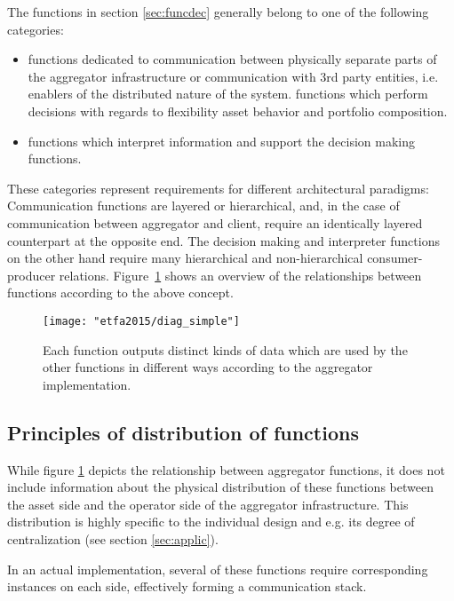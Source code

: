The functions in section \ref{sec:funcdec} generally belong to one of the following categories:
\begin{itemize}
\item functions dedicated to communication between physically separate parts of the aggregator infrastructure or communication with 3rd party entities, i.e. enablers of the distributed nature of the system.
\m functions which perform decisions with regards to flexibility asset behavior and portfolio composition.
\item functions which interpret information and support the decision making functions. 
\end{itemize}
These categories represent requirements for different architectural paradigms: Communication functions are layered or hierarchical, and, in the case of communication between aggregator and client, require an identically layered counterpart at the opposite end. The decision making and interpreter functions on the other hand require many hierarchical and non-hierarchical consumer-producer relations. %
Figure~\ref{fig:functiondiagram} shows an overview of the relationships between functions according to the above concept.

\begin{figure}[htb]
\centering
\texttt{[image: "etfa2015/diag\_simple"]}
\caption{Each function outputs distinct kinds of data which are used by the other functions in different ways according to the aggregator implementation.}
\label{fig:functiondiagram}
\end{figure}

\subsection{Principles of distribution of functions}

While figure \ref{fig:functiondiagram} depicts the relationship between aggregator functions, it does not include information about the physical distribution of these functions between the asset side and the operator side of the aggregator infrastructure. This distribution is highly specific to the individual design and e.g. its degree of centralization (see section \ref{sec:applic}).

In an actual implementation, several of these functions require corresponding instances on each side, effectively forming a communication stack. 

